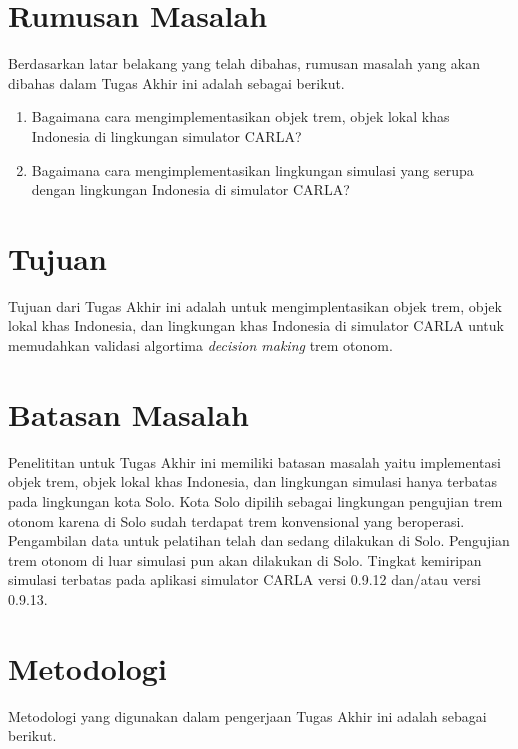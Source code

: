 \section{Rumusan Masalah}

Berdasarkan latar belakang yang telah dibahas, rumusan masalah yang akan dibahas
dalam Tugas Akhir ini adalah sebagai berikut.

\begin{enumerate}

    \item Bagaimana cara mengimplementasikan objek trem, objek lokal khas
    Indonesia di lingkungan simulator CARLA?

    \item Bagaimana cara mengimplementasikan lingkungan simulasi yang serupa
    dengan lingkungan Indonesia di simulator CARLA?

\end{enumerate}

\section{Tujuan}

Tujuan dari Tugas Akhir ini adalah untuk mengimplentasikan objek trem, objek
lokal khas Indonesia, dan lingkungan khas Indonesia di simulator CARLA untuk
memudahkan validasi algortima \textit{decision making} trem otonom.

\section{Batasan Masalah}

Penelititan untuk Tugas Akhir ini memiliki batasan masalah yaitu implementasi
objek trem, objek lokal khas Indonesia, dan lingkungan simulasi hanya terbatas
pada lingkungan kota Solo. Kota Solo dipilih sebagai lingkungan pengujian trem
otonom karena di Solo sudah terdapat trem konvensional yang beroperasi.
Pengambilan data untuk pelatihan telah dan sedang dilakukan di Solo. Pengujian
trem otonom di luar simulasi pun akan dilakukan di Solo. Tingkat kemiripan
simulasi terbatas pada aplikasi simulator CARLA versi 0.9.12 dan/atau versi
0.9.13.

\section{Metodologi}

Metodologi yang digunakan dalam pengerjaan Tugas Akhir ini adalah sebagai
berikut.

